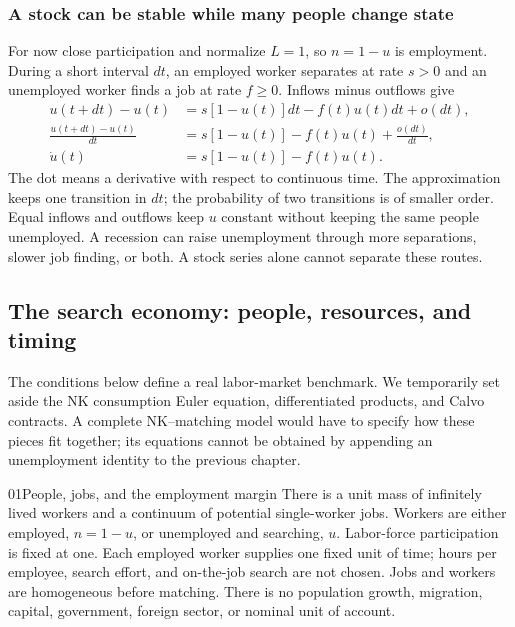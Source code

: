 \subsubsection{A stock can be stable while many people change state}

For now close participation and normalize $L=1$, so $n=1-u$ is employment.
During a short interval $dt$, an employed worker separates at rate $s>0$ and an
unemployed worker finds a job at rate $f\geq0$. Inflows minus outflows give
\begin{align}
 u(t+dt)-u(t)&=s[1-u(t)]dt-f(t)u(t)dt+o(dt),\\
 \frac{u(t+dt)-u(t)}{dt}&=s[1-u(t)]-f(t)u(t)+\frac{o(dt)}{dt},\\
 \dot u(t)&=s[1-u(t)]-f(t)u(t).
 \label{eq:lm-unemployment-flow}
\end{align}
The dot means a derivative with respect to continuous time. The approximation
keeps one transition in $dt$; the probability of two transitions is of smaller
order. Equal inflows and outflows keep $u$ constant without keeping the same
people unemployed. A recession can raise unemployment through more separations,
slower job finding, or both. A stock series alone cannot separate these routes.

\subsection{The search economy: people, resources, and timing}

The conditions below define a real labor-market benchmark. We temporarily set
aside the NK consumption Euler equation, differentiated products, and Calvo
contracts. A complete NK--matching model would have to specify how these
pieces fit together; its equations cannot be obtained by appending an
unemployment identity to the previous chapter.

\begin{modelsetup}[1]
\begin{modelcondition}{01}{People, jobs, and the employment margin}
There is a unit mass of infinitely lived workers and a continuum of potential
single-worker jobs. Workers are either employed, $n=1-u$, or unemployed and
searching, $u$. Labor-force participation is fixed at one. Each employed worker
supplies one fixed unit of time; hours per employee, search effort, and
on-the-job search are not chosen. Jobs and workers are homogeneous before
matching. There is no population growth, migration, capital, government,
foreign sector, or nominal unit of account.
\end{modelcondition}
\end{modelsetup}

